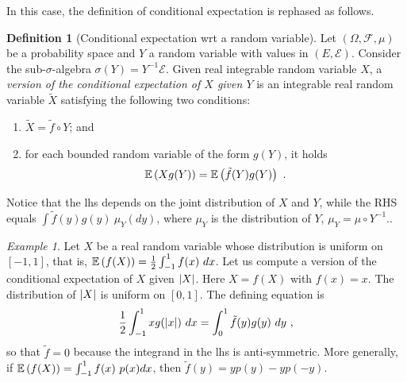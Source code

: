 \documentclass[12pt,a4paper]{amsart}
\theoremstyle{plain}%
\theoremstyle{definition}
\newtheorem{definition}{Definition}%
\theoremstyle{remark}
\newtheorem{example}{Example}
\begin{document}
In this case, the definition of conditional expectation is rephased as
follows.

\begin{definition}[Conditional expectation wrt a random variable]
Let $(\Omega,\mathcal F,\mu)$ be a probability space and $Y$ a random
variable with values in $(E,\mathcal E)$. Consider the
sub-$\sigma$-algebra $\sigma(Y) = Y^{-1} \mathcal E$. Given real integrable random variable $X$, a
\emph{version of the conditional expectation of $X$ given $Y$} is an integrable real random variable $\widetilde X$ satisfying the following two conditions:
\begin{enumerate}
\item $\widetilde X = \tilde f \circ Y$; and
\item for each bounded random variable of the form
  $g(Y)$, it holds
  \begin{equation*}
    \operatorname{\mathbb E}\left(Xg(Y)\right) = \operatorname{\mathbb E}\left(\tilde f(Y) g(Y)\right) \ .
  \end{equation*}
\end{enumerate}
\end{definition}

Notice that the lhs depends on the joint distribution of $X$ and $Y$,
while the RHS equals $\int \tilde f(y)g(y) \ \mu_Y(dy)$, where $\mu_Y$
is the distribution of $Y$, $\mu_Y= \mu \circ Y^{-1}$..

\begin{example}
Let $X$ be a real random variable whose distribution is uniform on
$[-1,1]$, that is, $\operatorname{\mathbb E}\left(f(X)\right) = \frac12 \int_{-1}^1 f(x) \ dx$. Let us
compute a version of the conditional expectation of $X$ given $\left\vert X\right\vert$. Here $X = f(X)$ with $f(x) = x$. The distribution of $\left\vert X\right\vert$ is uniform on $[0,1]$. The defining
equation is
\begin{equation*}
  \frac12 \int_{-1}^1 x g(\left\vert x\right\vert) \ dx = \int_0^1 \tilde f(y) g(y) \
  dy  \ , 
\end{equation*}
so that $\widetilde f = 0$ because the integrand in the lhs is
anti-symmetric. More generally, if $\operatorname{\mathbb E}\left(f(X)\right) = \int_{-1}^1
f(x) \ p(x)dx$, then $\tilde f(y) = yp(y) - yp(-y)$.
\end{example}
\end{document}
